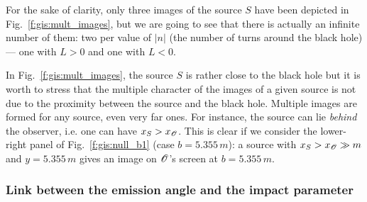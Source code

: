 For the sake of clarity, only three images of the source $S$ have been
depicted in Fig.~\ref{f:gis:mult_images}, but we are going to see
that there is actually an infinite
number of them: two per value of $|n|$ (the number of turns around the black hole)
--- one with $L>0$ and one with $L<0$.

\begin{remark}
In Fig.~\ref{f:gis:mult_images}, the source $S$ is rather close to the
black hole but it is worth to stress that
the multiple character of the images of a given
source is not due to the proximity between the source and the black hole.
Multiple images are formed for any source, even very far ones.
For instance, the source can lie \emph{behind} the
observer, i.e. one can have $x_S > x_{\mathscr{O}}$. This is clear if we consider
the lower-right panel of Fig.~\ref{f:gis:null_b1} (case $b=5.355\, m$):
a source with $x_S > x_{\mathscr{O}} \gg m$ and $y=5.355\, m$ gives an image on
$\mathscr{O}$'s screen at $b=5.355\, m$.
\end{remark}


\subsubsection{Link between the emission angle and the impact parameter}

